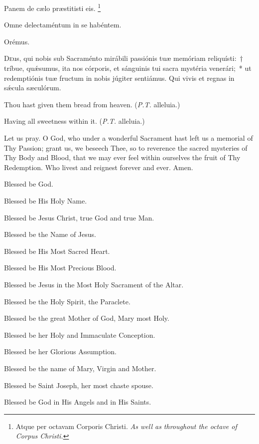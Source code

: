 \documentclass[11pt]{book}
\begin{document}
   \begin{paracol}{2}
\noindent \vv Panem de cælo præstitisti eis.
\tpalleluia{}\footnote{Atque per octavam Corporis Christi. \textit{As well as throughout the octave of Corpus Christi.}}

\noindent \rr Omne dele\-ctaméntum in se habéntem.
\tpalleluia{}


  Orémus.
  
  \lettrine{D}{e}us, qui nobis sub Sacraménto mirábili passiónis tuæ memóriam reliquísti:~† tríbue, quǽsumus, ita nos córporis, et sánguinis tui sacra mystéria venerári;~* ut redemptiónis tuæ fructum in nobis júgiter sentiámus. Qui vivis et regnas in sǽcula sæculórum. 

  \switchcolumn
\begin{otherlanguage}{english}
\noindent \vv Thou hast given them bread from heaven.
(\textit{P.T.} alleluia.)

\noindent \rr Having all sweetness within it.
(\textit{P.T.} alleluia.)

\noindent Let us pray. O God, who under a wonderful Sacrament hast left us a memorial of Thy Passion; grant us, we beseech Thee, so to reverence the sacred mysteries of Thy Body and Blood, that we may ever feel within ourselves the fruit of Thy Redemption. Who livest and reignest forever and ever. Amen.
\end{otherlanguage}\end{paracol}

\begin{multicols}{2}
\raggedcolumns
\begin{otherlanguage}{english}

Blessed be God. 

Blessed be His Holy Name. 

Blessed be Jesus Christ, true God and true Man.
 
Blessed be the Name of Jesus.

Blessed be His Most Sacred Heart.

Blessed be His Most Precious Blood.

Blessed be Jesus in the Most Holy Sacrament of the Altar.

Blessed be the Holy Spirit, the Paraclete.

Blessed be the great Mother of God, Mary most Holy.

Blessed be her Holy and Immaculate Conception.


Blessed be her Glorious Assumption.

Blessed be the name of Mary, Virgin and Mother.

Blessed be Saint Joseph, her most chaste spouse.

Blessed be God in His Angels and in His Saints.

\end{otherlanguage}
\end{multicols}
\end{document}
